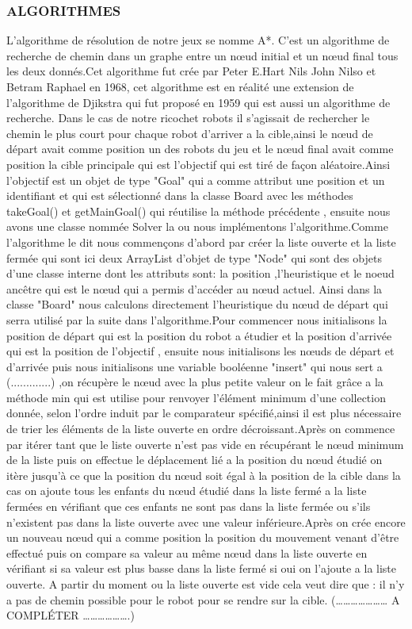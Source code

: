 \documentclass[a4paper]{article} %
\begin{document}
\subsubsection{ALGORITHMES}
L'algorithme de résolution de notre jeux se nomme A*. C'est un algorithme de recherche de chemin dans un graphe entre un nœud initial et un nœud final tous les deux donnés.Cet algorithme fut crée par Peter E.Hart Nils John Nilso et Betram Raphael en 1968, cet algorithme est en réalité une extension de l'algorithme de Djikstra qui fut proposé en 1959 qui est aussi un algorithme de recherche.
Dans le cas de notre ricochet robots il s'agissait de rechercher le chemin le plus court pour chaque robot d'arriver a la cible,ainsi le nœud de départ avait comme position un des robots du jeu  et le nœud final avait comme position la cible principale qui est l'objectif qui est tiré de façon aléatoire.Ainsi l'objectif est un objet de type "Goal" qui a comme attribut une position et un identifiant et qui est sélectionné dans la classe Board avec les méthodes takeGoal() et getMainGoal() qui réutilise la méthode précédente , ensuite nous avons une classe nommée Solver la ou nous implémentons l'algorithme.Comme l'algorithme le dit nous commençons d'abord par créer la liste ouverte et la liste fermée qui sont ici deux ArrayList d'objet de type "Node" qui sont des objets d'une classe interne dont les attributs sont: la position ,l'heuristique et le noeud ancêtre qui est le nœud qui a permis d’accéder au nœud actuel. Ainsi dans la classe "Board" nous calculons directement l'heuristique du nœud de départ qui serra utilisé par la suite dans l'algorithme.Pour commencer nous initialisons la position de départ qui est la position du robot a étudier et la position d'arrivée qui est la position de l'objectif , ensuite nous initialisons les nœuds de départ et d'arrivée puis nous initialisons une variable booléenne "insert" qui nous sert a (.............)  ,on récupère le nœud avec la plus petite valeur on le fait grâce a la méthode min qui est utilise pour renvoyer l'élément minimum d'une collection donnée, selon l'ordre induit par le comparateur spécifié,ainsi il est plus nécessaire de trier les éléments de la liste ouverte en ordre décroissant.Après on commence par itérer tant que le liste ouverte n'est pas vide en récupérant le nœud minimum de la liste puis on effectue le déplacement lié a la position du nœud étudié on itère jusqu’à ce que la position du nœud soit égal à la position de la cible dans la cas on ajoute tous les enfants du nœud étudié dans la liste fermé a la liste fermées en vérifiant que ces enfants ne sont pas dans la liste fermée ou s'ils n'existent pas dans la liste ouverte  avec
une valeur inférieure.Après on crée encore un nouveau nœud qui a comme position la position du mouvement venant d’être effectué puis on compare sa valeur au même nœud dans la liste ouverte en vérifiant si sa valeur est plus basse dans la liste fermé si oui on l'ajoute a la liste ouverte. A partir du moment ou la liste ouverte est vide cela veut dire que : il n'y a pas de chemin possible pour le robot pour se rendre sur la cible.
(………………… A COMPLÉTER ……………….)
\end{document}
